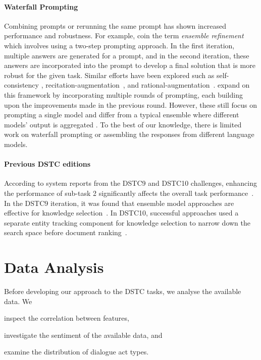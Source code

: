 \documentclass[11pt]{article}
\begin{document}
\paragraph{Waterfall Prompting}
Combining prompts or rerunning the same prompt has shown increased performance and robustness. For example, \citet{singhal2023expertlevel} coin the term \textit{ensemble refinement} which involves using a two-step prompting approach. In the first iteration, multiple answers are generated for a prompt, and in the second iteration, these answers are incorporated into the prompt to develop a final solution that is more robust for the given task. Similar efforts have been explored such as self-consistency \cite{wang2023selfconsistency}, recitation-augmentation~\cite{sun2023recitationaugmented}, and rational-augmentation~\cite{wang2022rationale}. \citet{pitis2023boosted} expand on this framework by incorporating multiple rounds of prompting, each building upon the improvements made in the previous round. However, these still focus on prompting a single model and differ from a typical ensemble where different models' output is aggregated \cite{wang2023selfconsistency}. To the best of our knowledge, there is limited work on waterfall prompting or assembling the responses from different language models.

\paragraph{Previous DSTC editions}
According to system reports from the DSTC9 and DSTC10 challenges, enhancing the performance of sub-task 2 significantly affects the overall task performance~\cite{kim-etal-2020-beyond}. In the DSTC9 iteration, it was found that ensemble model approaches are effective for knowledge selection~\cite{kim-etal-2020-beyond}. In DSTC10, successful approaches used a separate entity tracking component for knowledge selection to narrow down the search space before document ranking~\cite{kim2022knowledge}.

\section{Data Analysis}
\label{sec:data_analysis}
Before developing our approach to the DSTC tasks, we analyse the available data. We \begin{enumerate*}
    \item inspect the correlation between features,
    \item investigate the sentiment of the available data, and
    \item examine the distribution of dialogue act types.
\end{enumerate*}
\end{document}
